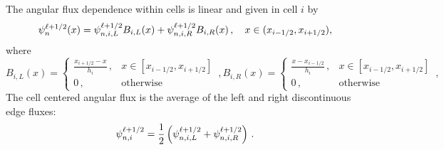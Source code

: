 The angular flux dependence within cells is linear and given in cell $i$ by
\begin{equation} \label{eq:afdef}
\psi_{n}^{\ell+1/2}(x) = \psi_{n,i,L}^{\ell+1/2} B_{i,L}(x) + \psi_{n,i,R}^{\ell+1/2} B_{i,R}(x) \,, \quad x \in (x_{i-1/2},x_{i+1/2}),
\end{equation}
where
		\begin{subequations}
		\begin{equation}\label{eq:bfunL}
			B_{i,L}(x) = \begin{cases}
				\frac{x_{i+1/2} - x}{h_i} \,, & x \in [x_{i-1/2}, x_{i+1/2}] \\ 
				0 \,, & \text{otherwise}
			\end{cases} \,,
		\end{equation}
		\begin{equation}\label{eq:bfunR}
			B_{i,R}(x) = \begin{cases}
				\frac{x - x_{i-1/2}}{h_i} \,, & x \in [x_{i-1/2}, x_{i+1/2}] \\ 
				0 \,, & \text{otherwise}
			\end{cases} \,,
		\end{equation}
	\end{subequations}
The cell centered angular flux is the average of the left and right discontinuous edge fluxes:
	\begin{equation} \label{eq:lldg_i}
		\psi_{n,i}^{\ell+1/2} = \frac{1}{2}\left(\psi_{n,i,L}^{\ell+1/2} + \psi_{n,i,R}^{\ell+1/2}\right) \,.
	\end{equation}

